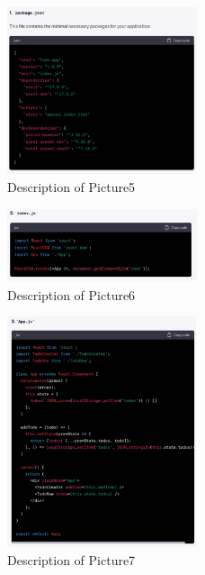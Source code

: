 \documentclass[runningheads]{llncs}
\begin{document}
\begin{figure}[h]
    \centering
    \includegraphics[width=0.5\textwidth]{Pictures/Picture5.jpg}
    \caption{Description of Picture5}
    \label{fig:picture5}
\end{figure}
\begin{figure}[h]
    \centering
    \includegraphics[width=0.5\textwidth]{Pictures/Picture6.jpg}
    \caption{Description of Picture6}
    \label{fig:picture6}
\end{figure}
\begin{figure}[h]
    \centering
    \includegraphics[width=0.5\textwidth]{Pictures/Picture7.jpg}
    \caption{Description of Picture7}
    \label{fig:picture7}
\end{figure}
\end{document}

